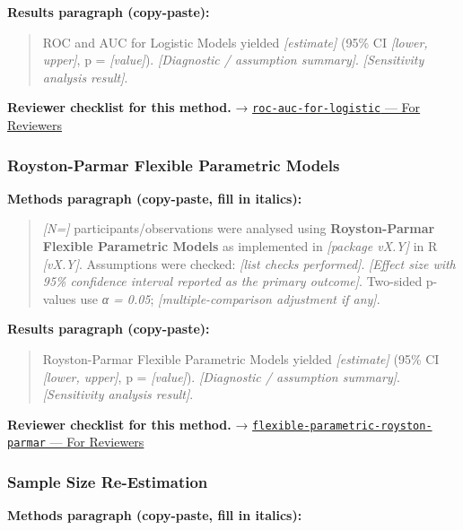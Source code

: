 \documentclass[
]{article}
\begin{document}
\textbf{Results paragraph (copy-paste):}

\begin{quote}
ROC and AUC for Logistic Models yielded \emph{{[}estimate{]}} (95\% CI
\emph{{[}lower, upper{]}}, p = \emph{{[}value{]}}). \emph{{[}Diagnostic
/ assumption summary{]}}. \emph{{[}Sensitivity analysis result{]}}.
\end{quote}

\textbf{Reviewer checklist for this method.} →
\href{../chapters/07-regression/roc-auc-for-logistic.Rmd\#for-reviewers}{\texttt{roc-auc-for-logistic}
--- For Reviewers}

\subsubsection{Royston-Parmar Flexible Parametric
Models}\label{royston-parmar-flexible-parametric-models}

\textbf{Methods paragraph (copy-paste, fill in italics):}

\begin{quote}
\emph{{[}N={]}} participants/observations were analysed using
\textbf{Royston-Parmar Flexible Parametric Models} as implemented in
\emph{{[}package vX.Y{]}} in R \emph{{[}vX.Y{]}}. Assumptions were
checked: \emph{{[}list checks performed{]}}. \emph{{[}Effect size with
95\% confidence interval reported as the primary outcome{]}}. Two-sided
p-values use \emph{α = 0.05}; \emph{{[}multiple-comparison adjustment if
any{]}}.
\end{quote}

\textbf{Results paragraph (copy-paste):}

\begin{quote}
Royston-Parmar Flexible Parametric Models yielded \emph{{[}estimate{]}}
(95\% CI \emph{{[}lower, upper{]}}, p = \emph{{[}value{]}}).
\emph{{[}Diagnostic / assumption summary{]}}. \emph{{[}Sensitivity
analysis result{]}}.
\end{quote}

\textbf{Reviewer checklist for this method.} →
\href{../chapters/11-survival/flexible-parametric-royston-parmar.Rmd\#for-reviewers}{\texttt{flexible-parametric-royston-parmar}
--- For Reviewers}

\subsubsection{Sample Size
Re-Estimation}\label{sample-size-re-estimation}

\textbf{Methods paragraph (copy-paste, fill in italics):}
\end{document}
